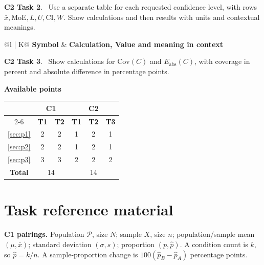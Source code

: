 \textbf{C2 Task 2}. \cTwoB\ Use a separate table for each requested confidence level, with rows $\bar x,\mathrm{MoE},L,U,\mathrm{CI},W$. Show calculations and then results with units and contextual meanings.
\begin{center}
\begin{tabularx}{\linewidth}{@{}l | K@{}}
\toprule
\textbf{Symbol} & \textbf{Calculation, Value and meaning in context}\\
\bottomrule
\end{tabularx}
\end{center}

\textbf{C2 Task 3}. \cTwoC\ Show calculations for $\mathrm{Cov}(C)$ and $E_{\mathrm{abs}}(C)$, with coverage in percent and absolute difference in percentage points. 

\endgroup




\noindent\begin{minipage}{\linewidth}
	\centering
	\textbf{Available points}\par\smallskip
	
	\centering
	\begin{tabular}{|c||c|c||c|c|c|}
		\hline
		\multirow[c]{2}{*}{\textbf{\textnumero}} & \multicolumn{2}{c||}{\textbf{C1}}
		& \multicolumn{3}{c|}{\textbf{C2}}\\
		\cline{2-6}
		& \textbf{T1} & \textbf{T2}
		& \textbf{T1} & \textbf{T2} & \textbf{T3}\\
		\hline
		\ref*{sec:p1} & 2 & 2 & 1 & 2 & 1\\
		\hline
		\ref*{sec:p2} & 2 & 2 & 1 & 2 & 1\\
		\hline
		\ref*{sec:p3} & 3 & 3 & 2 & 2 & 2\\
		\hline
		\textbf{Total}
		& \multicolumn{2}{c||}{14}
		& \multicolumn{3}{c|}{14}\\
		\hline
	\end{tabular}
	
\end{minipage}\par

\clearpage
\section*{Task reference material}
\textbf{C1 pairings.} Population $\mathcal P$, size $N$; sample $X$, size $n$; population/sample mean $(\mu,\bar x)$; standard deviation $(\sigma,s)$; proportion $(p,\hat p)$. A condition count is $k$, so $\hat p=k/n$. A sample-proportion change is $100(\hat p_B-\hat p_A)$ percentage points.

